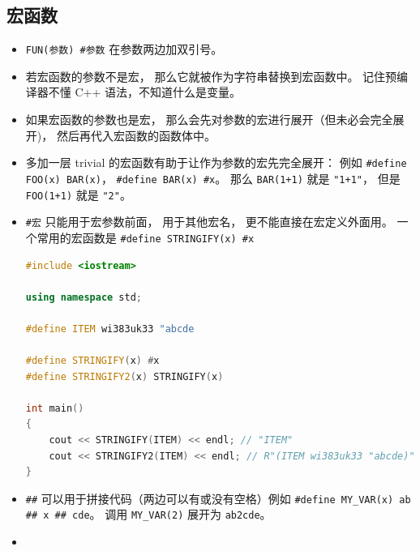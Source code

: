 \subsection{宏函数}
\begin{itemize}
\item \verb`FUN(参数) #参数` 在参数两边加双引号。
\item 若宏函数的参数不是宏， 那么它就被作为字符串替换到宏函数中。 记住预编译器不懂 C++ 语法，不知道什么是变量。
\item 如果宏函数的参数也是宏， 那么会先对参数的宏进行展开（但未必会完全展开)， 然后再代入宏函数的函数体中。
\item 多加一层 trivial 的宏函数有助于让作为参数的宏先完全展开： 例如 \verb`#define FOO(x) BAR(x)`， \verb`#define BAR(x) #x`。 那么 \verb`BAR(1+1)` 就是 \verb`"1+1"`， 但是 \verb`FOO(1+1)` 就是 \verb`"2"`。
\item \verb`#宏` 只能用于宏参数前面， 用于其他宏名， 更不能直接在宏定义外面用。 一个常用的宏函数是 \verb`#define STRINGIFY(x) #x`
\begin{lstlisting}[language=cpp]
#include <iostream>

using namespace std;

#define ITEM wi383uk33 "abcde

#define STRINGIFY(x) #x
#define STRINGIFY2(x) STRINGIFY(x)

int main()
{
	cout << STRINGIFY(ITEM) << endl; // "ITEM"
	cout << STRINGIFY2(ITEM) << endl; // R"(ITEM wi383uk33 "abcde)"
}
\end{lstlisting}
\item \verb`##` 可以用于拼接代码（两边可以有或没有空格）例如 \verb`#define MY_VAR(x) ab ## x ## cde`。 调用 \verb`MY_VAR(2)` 展开为 \verb`ab2cde`。
\item 
\end{itemize}
